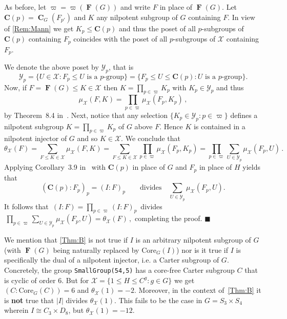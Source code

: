 \documentclass[10pt,a4paper]{amsart}
\numberwithin{equation}{section}
\DeclareMathOperator{\fitt}{\mathbf{F}}
\DeclareMathOperator{\cent}{\mathbf{C}}
\newcommand{\card}[1]{\left\lvert{#1}\right\rvert}
\renewcommand{\leq}{\leqslant}
\newenvironment{proofofB}{{\bf {Proof of Theorem \ref{Thm:B}.} }}{\hfill $\blacksquare$ \\}
\def\C_p{{\mathbf{C}(p)}}
\begin{document}
\begin{proofofB}
As before, let $\varpi = \varpi(\fitt(G))$ 
and write $F$ in place of $\fitt(G)$.
Let $\C_p = \cent_G(F_{p'})$ and $K$ any nilpotent subgroup of $G$ containing $F$. In view of \autoref{Rem:Mann} we get $K_p \leq \C_p$ and thus   the poset of all $p$-subgroups of $\C_p$ containing $F_p$ 
coincides with the poset of all $p$-subgroups of $\mathcal{X}$ containing $F_p $. 

We denote the above poset by $\mathcal{Y}_p$, that is 
\[
\mathcal{Y}_p = \{ U \in \mathcal{X} : F_p \leq U \text{ is a $p$-group} \} = \{ F_p \leq U \leq \C_p : U \text{ is a $p$-group}\}.  
\]
Now, if $F=\fitt(G) \leq K \in \mathcal{X}$ 
then $K = \prod_{p \in \varpi} K_p$ 
with $K_p \in \mathcal{Y}_p$ and thus 
\[
\mu_{\mathcal{X}}(F, K) = \prod_{p \in \varpi} \mu_{\mathcal{X}}(F_p, K_p)\,,
\]
by Theorem~8.4 in~\cite{mobius}.
Next, notice that any selection $\{ K_p \in \mathcal{Y}_p : p \in \varpi \}$ 
defines a nilpotent subgroup $K = \prod_{p \in \varpi} K_p$ of $G$ above $F$. 
Hence $K$ is contained in a nilpotent injector of $G$ and so $K \in \mathcal{X}$. 
We conclude that 
\begin{equation}
\theta_{\mathcal{X}}(F) =  \sum_{F \leq K \in \mathcal{X}} \mu_{\mathcal{X}}(F, K) 
                        = \sum_{F \leq K \in \mathcal{X}}
                           \prod_{p \in \varpi} \mu_{\mathcal{X}}(F_p, K_p) 
                        = \prod_{p \in \varpi} \sum_{U \in \mathcal{Y}_p} \mu_{\mathcal{X}}(F_p, U)\,.
\end{equation}
Applying Corollary~3.9 in~\cite{mobius} 
with $\C_p$ in place of $G$
and $F_p$ in place of $H$ yields that 
\[
(\C_p : F_p)_p = (I : F)_p \quad\quad \mbox{divides} \quad \sum_{U \in \mathcal{Y}_p} \mu_{\mathcal{X}}(F_p, U).
\]
It follows that
$\, (I : F) = \prod_{p \in \varpi} (I : F)_p\, $  divides 
$\, \prod_{p \in \varpi} \sum_{U \in \mathcal{Y}_p} \mu_{\mathcal{X}}(F_p, U)
= \theta_{\mathcal{X}}(F)\, , $
completing the proof.
\end{proofofB}

We mention that \autoref{Thm:B} is not true if $I$
is an arbitrary nilpotent subgroup of $G$ 
(with $\fitt(G)$ being naturally replaced by $\mathrm{Core}_G(I)$)
nor is it true if $I$ is specifically the dual of a nilpotent injector,
i.e. a Carter subgroup of $G$.
Concretely, the group \texttt{SmallGroup(54,5)} has a core-free
Carter subgroup $C$ that is cyclic of order $6$. 
But for $\mathcal{X} = \{1 \leq H \leq C^g : g \in G\}$ we get 
$(C : \mathrm{Core}_G(C)) = 6$ and  $\theta_{\mathcal{X}}(1) = -2$. 
Moreover, in the context of~\autoref{Thm:B} it is \textbf{not} true
that $\card{I}$ divides $\theta_{\mathcal{X}}(1)$.
This fails to be the case in $G = S_3 \times S_4$ wherein $I \cong C_3 \times D_8$,
but $\theta_{\mathcal{X}}(1) = -12$.
\end{document}
